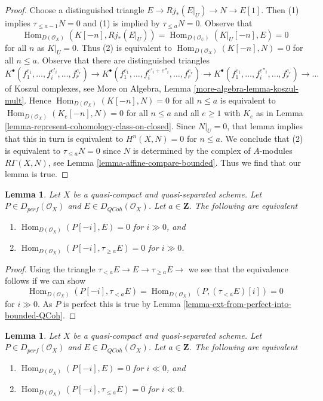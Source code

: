 \documentclass{stacks-project}
\theoremstyle{plain}
\newtheorem{lemma}[subsection]{Lemma}
\theoremstyle{definition}
\theoremstyle{remark}
\numberwithin{equation}{subsection}
\def\Hom{\mathop{\mathrm{Hom}}\nolimits}
\def\QCoh{\mathit{QCoh}}
\begin{document}
\begin{proof}
Choose a distinguished triangle $E \to Rj_*(E|_U) \to N \to E[1]$. Then (1)
implies $\tau_{\leq a - 1}N = 0$ and (1) is implied by $\tau_{\leq a}N = 0$.
Observe that
$$
\Hom_{D(\mathcal{O}_X)}(K[-n], Rj_*(E|_U)) =
\Hom_{D(\mathcal{O}_U)}(K|_U[-n], E) = 0
$$
for all $n$ as $K|_U = 0$. Thus (2) is equivalent to
$\Hom_{D(\mathcal{O}_X)}(K[-n], N) = 0$ for all $n \leq a$. 
Observe that there are distinguished triangles
$$
K^\bullet(f_1^{e_1}, \ldots, f_i^{e'_i}, \ldots, f_r^{e_r}) \to
K^\bullet(f_1^{e_1}, \ldots, f_i^{e'_i + e''_i}, \ldots, f_r^{e_r}) \to
K^\bullet(f_1^{e_1}, \ldots, f_i^{e''_i}, \ldots, f_r^{e_r}) \to \ldots
$$
of Koszul complexes, see
More on Algebra, Lemma \ref{more-algebra-lemma-koszul-mult}. Hence
$\Hom_{D(\mathcal{O}_X)}(K[-n], N) = 0$ for all $n \leq a$
is equivalent to
$\Hom_{D(\mathcal{O}_X)}(K_e[-n], N) = 0$ for all $n \leq a$ and all $e \geq 1$
with $K_e$ as in Lemma \ref{lemma-represent-cohomology-class-on-closed}.
Since $N|_U = 0$, that lemma implies that this in turn is equivalent to
$H^n(X, N) = 0$ for $n \leq a$. We conclude that (2) is equivalent to
$\tau_{\leq a}N = 0$ since $N$ is determined by the complex of
$A$-modules $R\Gamma(X, N)$, see Lemma \ref{lemma-affine-compare-bounded}.
Thus we find that our lemma is true.
\end{proof}

\begin{lemma}
\label{lemma-bounded-truncation}
Let $X$ be a quasi-compact and quasi-separated scheme.
Let $P \in D_{perf}(\mathcal{O}_X)$ and $E \in D_{\QCoh}(\mathcal{O}_X)$. 
Let $a \in \mathbf{Z}$. The following are equivalent
\begin{enumerate}
\item $\Hom_{D(\mathcal{O}_X)}(P[-i], E) = 0$ for $i \gg 0$, and
\item $\Hom_{D(\mathcal{O}_X)}(P[-i], \tau_{\geq a} E) = 0$ for $i \gg 0$.
\end{enumerate}
\end{lemma}

\begin{proof}
Using the triangle $ \tau_{< a} E \to E \to \tau_{\geq a} E \to$
we see that the equivalence follows if we can show
$$
\Hom_{D(\mathcal{O}_X)}(P[-i], \tau_{< a} E) =
\Hom_{D(\mathcal{O}_X)}(P, (\tau_{< a} E)[i]) = 0 
$$
for $i \gg 0$. As $P$ is perfect this is true by
Lemma \ref{lemma-ext-from-perfect-into-bounded-QCoh}.
\end{proof}

\begin{lemma}
\label{lemma-bounded-below-truncation}
Let $X$ be a quasi-compact and quasi-separated scheme. Let
$P \in D_{perf}(\mathcal{O}_X)$ and $E \in D_{\QCoh}(\mathcal{O}_X)$.
Let $a \in \mathbf{Z}$. The following are equivalent
\begin{enumerate}
\item $\Hom_{D(\mathcal{O}_X)}(P[-i], E) = 0$ for $i \ll 0$, and
\item $\Hom_{D(\mathcal{O}_X)}(P[-i], \tau_{\leq a} E) = 0$ for $i \ll 0$.
\end{enumerate}
\end{lemma}
\end{document}
